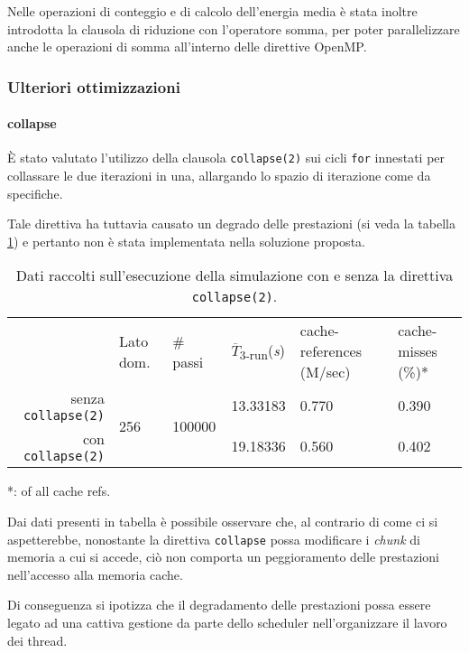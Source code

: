 Nelle operazioni di conteggio e di calcolo dell'energia media è stata inoltre
introdotta la clausola di riduzione con l'operatore somma, per poter
parallelizzare anche le operazioni di somma all'interno delle direttive OpenMP\@.

\subsubsection{Ulteriori ottimizzazioni}

\paragraph{collapse}

È stato valutato l'utilizzo della clausola \texttt{collapse(2)} sui cicli
\texttt{for} innestati per collassare le due iterazioni in una, allargando lo
spazio di iterazione come da specifiche\cite{openmp2018reference}.

Tale direttiva ha tuttavia causato un degrado delle prestazioni (si veda la
tabella \ref{tab:collapse}) e pertanto non è stata implementata nella soluzione proposta.

\begin{table}[ht]
\begin{tabularx}{\linewidth}{rXXXXX}
\cmidrule[\heavyrulewidth]{2-6}
& Lato dom. & \# passi & $\overline{T}$\textsubscript{3-run}(\textit{s})
& cache-references (M/sec) & cache-misses (\%)*\\
\cmidrule[\lightrulewidth]{2-6}
senza \texttt{collapse(2)} & \multirow{2}{*}{256} & \multirow{2}{*}{100000} &
   13.33183 & 0.770 & 0.390\\
\cmidrule{4-6}
   con \texttt{collapse(2)} &&& 19.18336 & 0.560 & 0.402\\
\cmidrule[\heavyrulewidth]{2-6}
\end{tabularx}
\caption{\label{tab:collapse}Dati raccolti sull'esecuzione della simulazione con
e senza la direttiva \texttt{collapse(2)}.}
\end{table}

*: of all cache refs.

Dai dati presenti in tabella è possibile osservare che, al contrario di come ci
si aspetterebbe, nonostante la direttiva \texttt{collapse} possa modificare i
\textit{chunk} di memoria a cui si accede, ciò non comporta un peggioramento
delle prestazioni nell'accesso alla memoria cache.

Di conseguenza si ipotizza che il degradamento delle prestazioni possa essere
legato ad una cattiva gestione da parte dello scheduler nell'organizzare il
lavoro dei thread.

